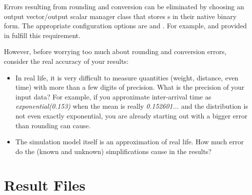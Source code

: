 %
%
%

Errors resulting from rounding and conversion can be eliminated by choosing an
output vector/output scalar manager class that stores s in their
native binary form. The appropriate configuration options are
 and . For
example,  and
 provided in  fulfill
this requirement.

However, before worrying too much about rounding and conversion errors, consider
the real accuracy of your results:

\begin{itemize}
  \item In real life, it is very difficult to measure quantities (weight,
    distance, even time) with more than a few digits of precision. What is the
    precision of your input data? For example, if you approximate inter-arrival
    time as \textit{exponential(0.153)} when the mean is really
    \textit{0.152601...} and the distribution is not even exactly exponential, you
    are already starting out with a bigger error than rounding can cause.
  \item The simulation model itself is an approximation of real life. How much
    error do the (known and unknown) simplifications cause in the results?
\end{itemize}



\section{Result Files}
\label{sec:ana-sim:result-files}

